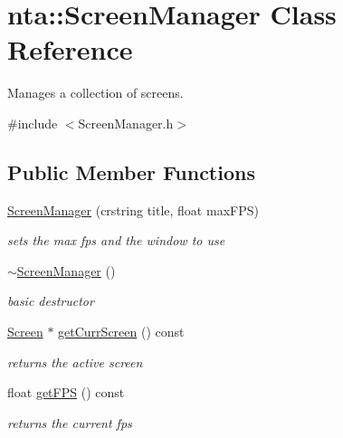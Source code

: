 \hypertarget{classnta_1_1ScreenManager}{}\section{nta\+:\+:Screen\+Manager Class Reference}
\label{classnta_1_1ScreenManager}


Manages a collection of screens.  




{\ttfamily \#include $<$Screen\+Manager.\+h$>$}

\subsection*{Public Member Functions}
\begin{DoxyCompactItemize}
\item 
\mbox{\label{classnta_1_1ScreenManager_a46a7adb4a69fea8e074fa2251c815bad}} 
\hyperlink{classnta_1_1ScreenManager_a46a7adb4a69fea8e074fa2251c815bad}{Screen\+Manager} (crstring title, float max\+F\+PS)
\begin{DoxyCompactList}\small\item\em sets the max fps and the window to use \end{DoxyCompactList}\item 
\mbox{\label{classnta_1_1ScreenManager_aea609a639ffdc377e798eda054e6a4ba}} 
\hyperlink{classnta_1_1ScreenManager_aea609a639ffdc377e798eda054e6a4ba}{$\sim$\+Screen\+Manager} ()
\begin{DoxyCompactList}\small\item\em basic destructor \end{DoxyCompactList}\item 
\hyperlink{classnta_1_1Screen}{Screen} $\ast$ \hyperlink{classnta_1_1ScreenManager_a4b26e8adc481bfb37a088e047e4ccc2a}{get\+Curr\+Screen} () const
\begin{DoxyCompactList}\small\item\em returns the active screen \end{DoxyCompactList}\item 
\mbox{\label{classnta_1_1ScreenManager_a24e61f523b383277b7284cab76ad9e5a}} 
float \hyperlink{classnta_1_1ScreenManager_a24e61f523b383277b7284cab76ad9e5a}{get\+F\+PS} () const
\begin{DoxyCompactList}\small\item\em returns the current fps \end{DoxyCompactList}\item 

\end{DoxyCompactItemize}
